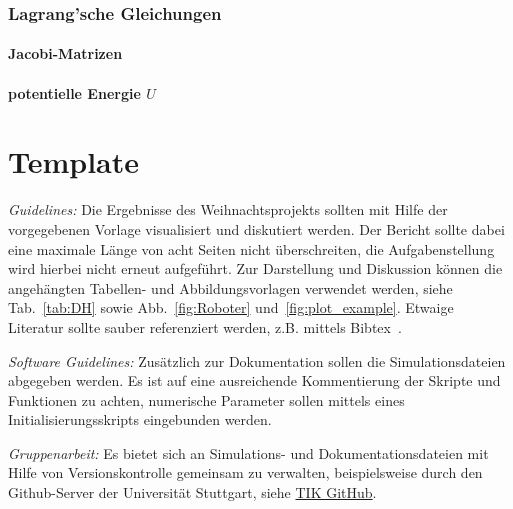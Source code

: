 \documentclass{MSM_latex}
\begin{document}
\subsubsection*{Lagrang'sche Gleichungen}

\paragraph*{Jacobi-Matrizen}



\paragraph*{potentielle Energie $U$}



\newpage


\section*{Template}


\textit{Guidelines:} Die Ergebnisse des Weihnachtsprojekts sollten mit Hilfe der vorgegebenen Vorlage  visualisiert und diskutiert werden. 
Der Bericht sollte dabei eine maximale Länge von acht Seiten nicht überschreiten, die Aufgabenstellung wird hierbei nicht erneut aufgeführt. 
Zur Darstellung und Diskussion können die angehängten Tabellen- und Abbildungsvorlagen verwendet werden, siehe Tab.~\ref{tab:DH} sowie Abb.~\ref{fig:Roboter} und~\ref{fig:plot_example}. 
Etwaige Literatur sollte sauber referenziert werden, z.B. mittels Bibtex~\cite{FehrSchmidSchneiderEberhard20,Fuchs23, DenavitHartenberg55,Lipkin05}.

\textit{Software Guidelines:}
Zusätzlich zur Dokumentation sollen die Simulationsdateien abgegeben werden.
Es ist auf eine ausreichende Kommentierung der Skripte und Funktionen zu achten, numerische Parameter sollen mittels eines Initialisierungsskripts eingebunden werden.

\textit{Gruppenarbeit:}
Es bietet sich an Simulations- und Dokumentationsdateien mit Hilfe von Versionskontrolle gemeinsam zu verwalten, beispielsweise durch den Github-Server der Universität Stuttgart, siehe \href{https://www.tik.uni-stuttgart.de/dienste-a-z/Git-Hosting/}{TIK GitHub}.

\end{document}
